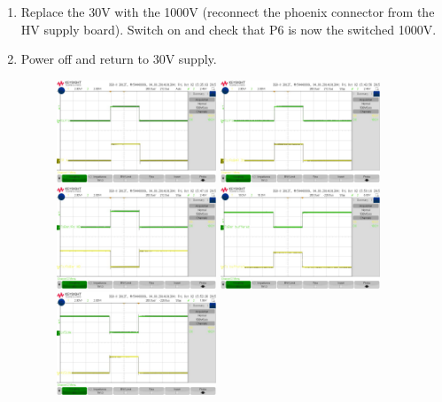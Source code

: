 \begin{enumerate}
	\item Replace the 30V with the 1000V (reconnect the phoenix connector from the HV supply board). Switch on and check that P6 is now the switched 1000V.
	\item Power off and return to 30V supply.
		\begin{figure}[H]
			\centering
			\includegraphics[width=0.45\textwidth]{images/hardware/signal_1.jpg}
			\includegraphics[width=0.45\textwidth]{images/hardware/signal_2.jpg}
			\includegraphics[width=0.45\textwidth]{images/hardware/signal_3.jpg}
			\includegraphics[width=0.45\textwidth]{images/hardware/signal_4.jpg}
			\includegraphics[width=0.45\textwidth]{images/hardware/signal_5.jpg}

\end{figure}
\end{enumerate}
